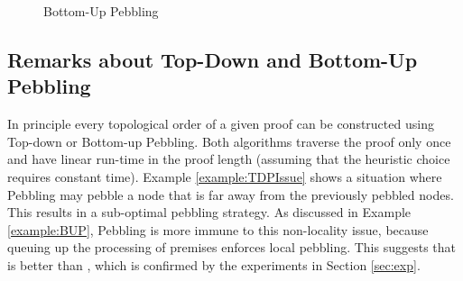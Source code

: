 \begin{example}
\begin{figure}[tb]
{\begin{minipage}{0.4\textwidth}
		\end{minipage}%
			}
		\caption{Bottom-Up Pebbling}
		\label{fig:BUP}
\end{figure}
\label{example:BUP}
\end{example}



\subsection{Remarks about Top-Down and Bottom-Up Pebbling} %
\label{sec:TDvsBU}

In principle every topological order of a given proof can be constructed using Top-down or Bottom-up Pebbling. Both algorithms traverse the proof only once and have linear run-time in the proof length (assuming that the heuristic choice requires constant time). Example \ref{example:TDPIssue} shows a situation where  Pebbling may pebble a node that is far away from the previously pebbled nodes. This results in a sub-optimal pebbling strategy.
As discussed in Example \ref{example:BUP},  Pebbling is more immune to this non-locality issue, because queuing up the processing of premises enforces local pebbling. This suggests that  is better than , which is confirmed by the experiments in Section \ref{sec:exp}.

